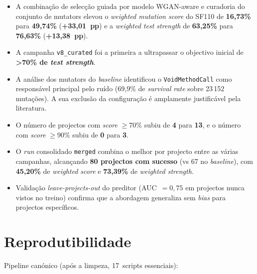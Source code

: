 \documentclass[12pt,a4paper]{article}
\begin{document}
\begin{itemize}
  \item A combinação de selecção guiada por modelo WGAN-aware e curadoria do conjunto
        de mutators elevou o \textit{weighted mutation score} do SF110 de
        \textbf{16,73\%} para \textbf{49,74\%} (\textbf{+33,01~pp}) e a \textit{weighted
        test strength} de \textbf{63,25\%} para \textbf{76,63\%} (\textbf{+13,38~pp}).

  \item A campanha \texttt{v8\_curated} foi a primeira a ultrapassar o objectivo inicial de
        \textbf{>70\% de \textit{test strength}}.

  \item A análise dos mutators do \textit{baseline} identificou o \texttt{VoidMethodCall}
        como responsável principal pelo ruído (69,9\% de \textit{survival rate} sobre
        23\,152 mutações). A sua exclusão da configuração é amplamente justificável
        pela literatura.

  \item O número de projectos com \textit{score} $\geq 70\%$ subiu de \textbf{4} para
        \textbf{13}, e o número com \textit{score} $\geq 90\%$ subiu de \textbf{0} para
        \textbf{3}.

  \item O \textit{run} consolidado \texttt{merged} combina o melhor por projecto entre
        as várias campanhas, alcançando \textbf{80 projectos com sucesso} (vs 67 no
        \textit{baseline}), com \textbf{45,20\%} de \textit{weighted score} e
        \textbf{73,39\%} de \textit{weighted strength}.

  \item Validação \textit{leave-projects-out} do preditor (AUC~$=0{,}75$ em projectos
        nunca vistos no treino) confirma que a abordagem generaliza sem \textit{bias} para
        projectos específicos.
\end{itemize}

\section*{Reprodutibilidade}

Pipeline canónico (após a limpeza, 17~scripts essenciais):
\end{document}
